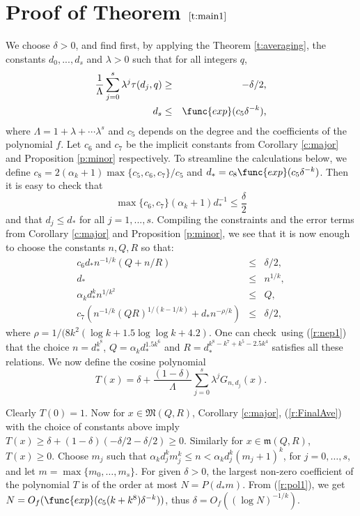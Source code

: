 \documentclass{amsart}
\numberwithin {equation}{section}
\begin{document}
\section{Proof of Theorem $\protect\ref{t:main1}$}

We choose $\delta >0$, and find first, by applying the Theorem \ref{t:averaging}, the constants $d_{0},...,d_{s}$ and $\lambda >0$ such that
for all integers $q$, 
\begin{eqnarray}
\frac{1}{\Lambda }\sum_{j=0}^{s}\lambda ^{j}\tau (d_{j},q) &\geq &-\delta /2{\text{,}}  \label{r:FinalAve} \\
d_{s} &\leq &\func{exp}(c_{5}\delta ^{-k}){\text{,}}  \label{r:Finald}
\end{eqnarray}where $\Lambda =1+\lambda +\cdots \lambda ^{s}$ and $c_{5}$ depends on the
degree and the coefficients of the polynomial $f$. Let $c_{6}$ and $c_{7}$
be the implicit constants from Corollary \ref{c:major} and Proposition \ref{p:minor} respectively. To streamline the calculations below, we define $c_{8}=2(\alpha _{k}+1)\max \{c_{5},c_{6},c_{7}\}/c_{5}$ and $d_{\ast }=c_{8}\func{exp}(c_{5}\delta ^{-k})$. Then it is easy to check that 
\begin{equation}
\max \{c_{6},c_{7}\}(\alpha _{k}+1)d_{\ast }^{-1}\leq \frac{\delta }{2}
\label{r:nep1}
\end{equation}and that $d_{j}\leq d_{\ast }$ for all $j=1,...,s$. Compiling the
constraints and the error terms from Corollary \ref{c:major} and Proposition \ref{p:minor}, we see that it is now enough to choose the constants $n,Q,R$
so that: 
\begin{eqnarray*}
c_{6}d_{\ast }n^{-1/k}(Q+n/R) &\leq &\delta /2, \\
d_{\ast } &\leq &n^{1/k}, \\
\alpha _{k}d_{\ast }^{k}n^{1/k^{2}} &\leq &Q, \\
c_{7}\left( n^{-1/k}\left( QR\right) ^{1/(k-1/k)}+d_{\ast }n^{-\rho
/k}\right) &\leq &\delta /2{\text{,}}
\end{eqnarray*}where $\rho =1/(8k^{2}(\log k+1.5\log \log k+4.2)$. One can check\ using (\ref{r:nep1}) that the choice $n=d_{\ast }^{k^{8}}$, $Q=\alpha _{k}d_{\ast
}^{1.5k^{6}}$ and $R=d_{\ast }^{k^{8}-k^{7}+k^{5}-2.5k^{4}}$ satisfies all
these relations. We now define the cosine polynomial 
\begin{equation*}
T(x)=\delta +\frac{(1-\delta )}{\Lambda }\sum_{j=0}^{s}\lambda
^{j}G_{n,d_{j}}(x).
\end{equation*}

Clearly $T(0)=1$. Now for $x\in {\mathfrak{M}}(Q,R)$, Corollary \ref{c:major}, (\ref{r:FinalAve}) with the choice of constants above imply $T(x)\geq
\delta +(1-\delta )(-\delta /2-\delta /2)\geq 0$. Similarly for $x\in {\mathfrak{m}}(Q,R)$, $T(x)\geq 0$. Choose $m_{j}$ such that $\alpha
_{k}d_{j}^{k}m_{j}^{k}\leq n<\alpha _{k}d_{j}^{k}(m_{j}+1)^{k}$, for $j=0,\ldots ,s$, and let $m=\max \{m_{0},\ldots ,m_{s}\}$. For given $\delta
>0$, the largest non-zero coefficient of the polynomial $T$ is of the order
at most $N=P(d_{\ast }m)$. From (\ref{r:pol1}), we get $N=O_{f}(\func{exp}(c_{5}(k+k^{8})\delta ^{-k}))$, thus $\delta =O_{f}((\log N)^{-1/k})$.
\end{document}

